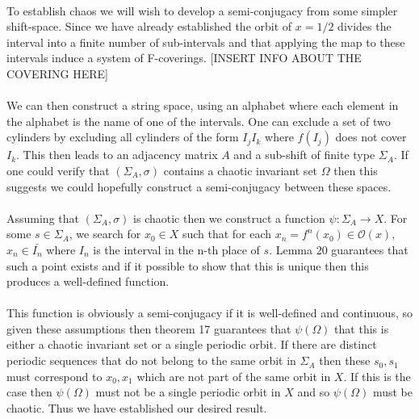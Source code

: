 \documentclass{article}
\begin{document}
\paragraph{}
To establish chaos we will wish to develop a semi-conjugacy from some simpler shift-space. Since 
we have already established the orbit of $x= 1/2$ divides the interval into a finite number of 
sub-intervals and that applying the map to these intervals induce a system of F-coverings. 
[INSERT INFO ABOUT THE COVERING HERE]

\paragraph{}
We can then construct a string space, using an alphabet where each element in the alphabet is the 
name of one of the intervals. One can exclude a set of two cylinders by excluding all cylinders of 
the form $I_jI_k$ where $f(I_j)$ does not cover $I_k$. This then leads to an adjacency matrix $A$ 
and a sub-shift of finite type $\Sigma_A$. If one could verify that $(\Sigma_A,\sigma)$ contains a 
chaotic invariant set $\Omega$ then this suggests we could hopefully construct a semi-conjugacy between these spaces. 

\paragraph{}
Assuming that $(\Sigma_A,\sigma)$ is chaotic then we construct a function 
$\psi: \Sigma_A \rightarrow X$. For some $s \in \Sigma_A$, we search for $x_0 \in X$ such that 
for each $x_n = f^n(x_0) \in \mathcal{O}(x)$, $x_n \in \bar{I_n}$ where $I_n$ is the interval in the 
n-th place of $s$. Lemma 20 guarantees that such a point exists and if it possible to show that 
this is unique then this produces a well-defined function. 

\paragraph{}
This function is obviously a semi-conjugacy if it is well-defined and continuous, so given these assumptions then 
theorem 17 guarantees that $\psi(\Omega)$ that this is either a chaotic invariant set or a 
single periodic orbit. If there are distinct periodic sequences that do not belong to the same orbit 
in $\Sigma_A$ then these $s_0,s_1$ must correspond to $x_0,x_1$ which are not part of the same orbit 
in $X$. If this is the case then $\psi(\Omega)$ must not be a single periodic orbit 
in $X$ and so $\psi(\Omega)$ must be chaotic. Thus we have established our desired result.
\end{document}
